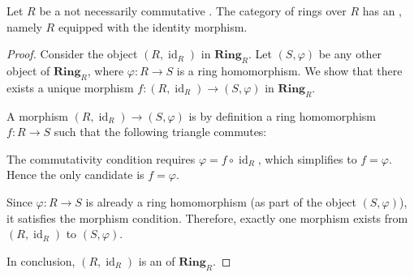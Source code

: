 \begin{lemma} \label{lemma:category_of_rings_over_a_ring_has_an_initial_object}
    Let $R$ be a not necessarily commutative .
    The category  of rings over $R$ has an , namely $R$ equipped with the identity morphism.
\end{lemma}

\begin{proof}
    Consider the object $(R, \operatorname{id}_R)$ in $\mathbf{Ring}_R$. Let $(S, \varphi)$ be any other object of $\mathbf{Ring}_R$, where $\varphi: R \to S$ is a ring homomorphism. We show that there exists a unique morphism $f: (R, \operatorname{id}_R) \to (S, \varphi)$ in $\mathbf{Ring}_R$.

    A morphism $(R, \operatorname{id}_R) \to (S, \varphi)$ is by definition a ring homomorphism $f: R \to S$ such that the following triangle commutes:
    \begin{center}
    \end{center}
    The commutativity condition requires $\varphi = f \circ \operatorname{id}_R$, which simplifies to $f = \varphi$. Hence the only candidate is $f = \varphi$.

    Since $\varphi: R \to S$ is already a ring homomorphism (as part of the object $(S, \varphi)$), it satisfies the morphism condition. Therefore, exactly one morphism exists from $(R, \operatorname{id}_R)$ to $(S, \varphi)$.

    In conclusion, $(R, \operatorname{id}_R)$ is an  of $\mathbf{Ring}_R$.
\end{proof}
